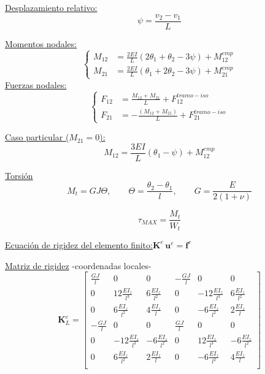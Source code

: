 \underline{Desplazamiento relativo:}
$$\psi=\frac{v_2 - v_1}{L}$$

\underline{Momentos nodales:}
$$
\left\{
\begin{array}{rl}
\displaystyle
M_{12} &=\frac{2 EI}{L} \left( 2 \theta_1  + \theta_2 - 3 \psi   \right)  +  M_{12}^{emp}  \\[3mm]
\displaystyle
M_{21} &=\frac{2 EI}{L} \left( \theta_1 + 2  \theta_2 - 3 \psi  \right)   +  M_{21}^{emp}
\end{array}
\right.
$$
\vspace{0.2cm}
\underline{Fuerzas nodales:}
$$
\left\{
\begin{array}{rl}
\displaystyle
F_{12} &= \frac{M_{12} + M_{21}}{L} + F_{12}^{tramo-iso} \\[3mm]
\displaystyle
F_{21} &= -\frac{(M_{12} + M_{21})}{L} + F_{21}^{tramo-iso} 
\end{array}
\right.
$$


\underline{Caso particular ($M_{21}=0$):}
$$
M_{12}=\frac{3EI}{L}\left( \theta_{1}-\psi \right) + M_{12}^{emp}
$$

\begin{center}
\end{center}

\underline{Torsión}
$$
M_t=GJ\Theta,
\qquad
\Theta=\frac{\theta_2 - \theta_1}{l},
\qquad
G=\frac{E}{2(1+\nu)}
$$


$$
\tau_{MAX}=\frac{M_t}{W_t}
$$


\vspace{0.2cm}
\begin{center}
	\def\svgwidth{0.65\textwidth}
	
\end{center}


\vspace{0.3cm}
\underline{Ecuación de rigidez del elemento finito:}\quad $ \textbf{K}^e \, \textbf{u}^e=\textbf{f}^e$

\vspace{0.3cm}
\underline{Matriz de rigidez} -coordenadas locales-
\renewcommand{\arraystretch}{1.35}
\[
\textbf{K}_L^e = 
\left[
\begin{matrix}
\frac{GJ}{l}  & 0 & 0 & -\frac{GJ}{l} & 0 & 0 \\
0  & 12\frac{EI_z}{l^3} & 6\frac{EI_z}{l^2} & 0  & -12\frac{EI_z}{l^3} & 6\frac{EI_z}{l^2} \\
0  & 6\frac{EI_z}{l^2} & 4\frac{EI_z}{l} & 0  & -6\frac{EI_z}{l^2} & 2\frac{EI_z}{l} \\
-\frac{GJ}{l}  & 0 & 0 & \frac{GJ}{l} & 0 & 0 \\
0  & -12\frac{EI_z}{l^3} & -6\frac{EI_z}{l^2} & 0  & 12\frac{EI_z}{l^3} & -6\frac{EI_z}{l^2} \\
0  & 6\frac{EI_z}{l^2} & 2\frac{EI_z}{l} & 0  & -6\frac{EI_z}{l^2} & 4\frac{EI_z}{l} \\
\end{matrix}
\right]
\]

